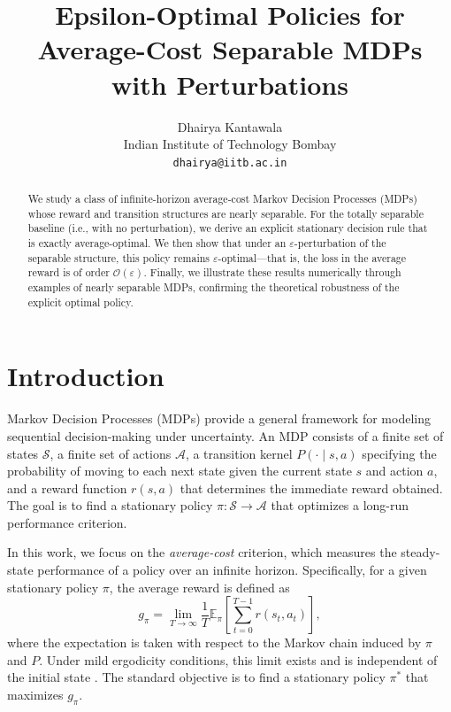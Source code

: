 \documentclass{article}
\title{Epsilon-Optimal Policies for Average-Cost Separable MDPs with Perturbations}
\author{
 Dhairya Kantawala \\
  Indian Institute of Technology Bombay\\
  \texttt{dhairya@iitb.ac.in}
}
\begin{document}
\maketitle
\begin{abstract}
We study a class of infinite-horizon average-cost Markov Decision Processes (MDPs) whose reward and transition structures are nearly separable. For the totally separable baseline (i.e., with no perturbation), we derive an explicit stationary decision rule that is exactly average-optimal. We then show that under an $\varepsilon$-perturbation of the separable structure, this policy remains $\varepsilon$-optimal—that is, the loss in the average reward is of order $\mathcal{O}(\varepsilon)$. Finally, we illustrate these results numerically through examples of nearly separable MDPs, confirming the theoretical robustness of the explicit optimal policy.
\end{abstract}



\section{Introduction}

Markov Decision Processes (MDPs) provide a general framework for modeling sequential decision-making under uncertainty. An MDP consists of a finite set of states $\mathcal{S}$, a finite set of actions $\mathcal{A}$, a transition kernel $P(\cdot \mid s,a)$ specifying the probability of moving to each next state given the current state $s$ and action $a$, and a reward function $r(s,a)$ that determines the immediate reward obtained. The goal is to find a stationary policy $\pi : \mathcal{S} \to \mathcal{A}$ that optimizes a long-run performance criterion.

In this work, we focus on the \emph{average-cost} criterion, which measures the steady-state performance of a policy over an infinite horizon. Specifically, for a given stationary policy $\pi$, the average reward is defined as
\begin{equation}
    g_\pi = \lim_{T \to \infty} \frac{1}{T} \mathbb{E}_\pi \left[ \sum_{t=0}^{T-1} r(s_t, a_t) \right],
\end{equation}
where the expectation is taken with respect to the Markov chain induced by $\pi$ and $P$. Under mild ergodicity conditions, this limit exists and is independent of the initial state \cite{Puterman1994}. The standard objective is to find a stationary policy $\pi^*$ that maximizes $g_\pi$.
\end{document}
